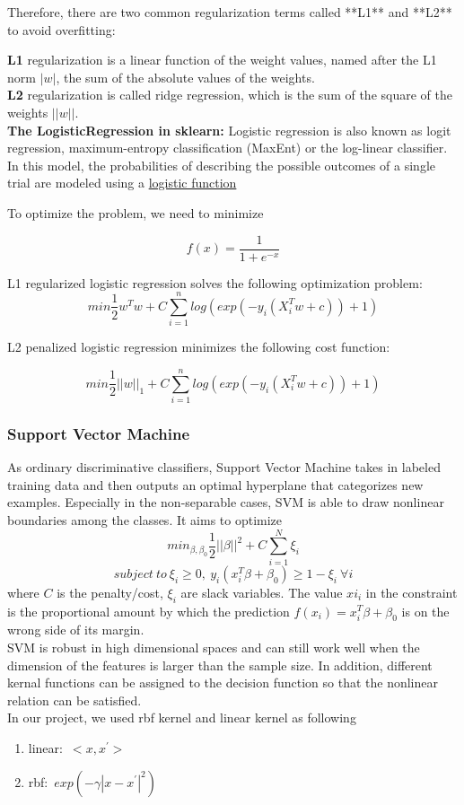 \documentclass[a4paper, 12pt]{report}
\begin{document}
\noindent Therefore, there are two common regularization terms called **L1** and **L2** to avoid overfitting:

\noindent \textbf{L1} regularization is a linear function of the weight values, named after the L1 norm $|w|$, the sum of the absolute values of the weights. \\
\textbf{L2} regularization is called ridge regression, which is the sum of the square of the weights $||w||$.\\

\noindent\textbf{The LogisticRegression in sklearn:}
Logistic regression is also known as logit regression, maximum-entropy classification (MaxEnt) or the log-linear classifier. In this model, the probabilities of describing the possible outcomes of a single trial are modeled using a \href{https://en.wikipedia.org/wiki/Logistic_function}{logistic function} \par

\noindent To optimize the problem, we need to minimize

$$
f(x) = \frac 1 {1+e^{-x}}
$$

\noindent L1 regularized logistic regression solves the following optimization problem:
$$
min\frac1{2}w^Tw + C \sum_{i = 1}^n log(exp(-y_{i}(X_{i}^Tw + c)) + 1)
$$

\noindent L2 penalized logistic regression minimizes the following cost function:

$$
min\frac1{2}||w||_{1} + C \sum_{i = 1}^n log(exp(-y_{i}(X_{i}^Tw + c)) + 1)
$$

\subsubsection*{Support Vector Machine}
As ordinary discriminative classifiers, Support Vector Machine
takes in labeled training data and then outputs an optimal hyperplane that categorizes new examples. Especially in the non-separable cases, SVM is able to draw nonlinear boundaries among the classes. It aims to optimize
$$min_{\beta, \beta_0}\frac{1}{2}||\beta||^2+C\sum_{i=1}^{N}\xi_i$$ 
$$subject\ to\ \xi_i\geq 0,\ y_i(x_i^T\beta+\beta_0)\geq 1-\xi_i\ \forall i$$ 
where $C$ is the penalty/cost, $\xi_i$ are slack variables. The value $xi_i$ in the constraint is the proportional amount by which the prediction $f(x_i)=x_i^T\beta+\beta_0$ is on the wrong side of its margin.\\

\noindent SVM is robust in high dimensional spaces and can still work well when the dimension of the features is larger than the sample size. In addition, different kernal functions can be assigned to the decision function so that the nonlinear relation can be satisfied.\\
In our project, we used rbf kernel and linear kernel as following
\begin{enumerate}
	\item []linear:\ $<x,x^{'}>$
	\item []rbf:\ $exp(-\gamma|x-x^{'}|^2)$
\end{enumerate}
\end{document}
